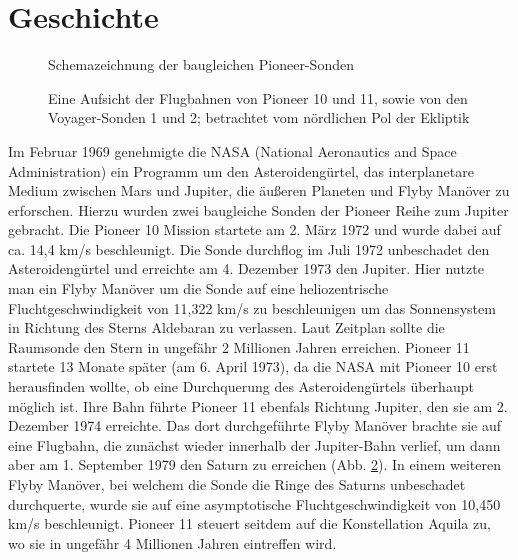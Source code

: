 \section{Geschichte}

\begin{figure}[htbn]
\begin{center}
\noindent    
{}
\end{center}
\vskip -10pt
  \caption{Schemazeichnung der baugleichen Pioneer-Sonden\cite{Turyshev2010}}\label{fig:pioneer}
\end{figure} 

\begin{figure}[htbn]
\begin{center}
\noindent    
{}
\end{center}
\vskip -10pt
  \caption{Eine Aufsicht der Flugbahnen von Pioneer 10 und 11, sowie von den Voyager-Sonden 1 und 2; betrachtet vom nördlichen Pol der Ekliptik\cite{Anderson2002}}
\label{fig:flugbahn}
\end{figure} 


Im Februar 1969 genehmigte die NASA (National Aeronautics and Space
Administration) ein Programm um den Asteroideng\"urtel, das
interplanetare Medium zwischen Mars und Jupiter, die \"au{\ss}eren
Planeten und Flyby Man\"over zu erforschen. Hierzu wurden zwei
baugleiche Sonden der Pioneer Reihe zum Jupiter gebracht. Die Pioneer 10 Mission startete am 2.
M\"arz 1972 und wurde dabei auf ca. 14,4 km/s beschleunigt. Die Sonde
durchflog im Juli 1972 unbeschadet den Asteroideng\"urtel und erreichte
am 4. Dezember 1973 den Jupiter. Hier nutzte man ein Flyby Man\"over
um die Sonde auf eine heliozentrische Fluchtgeschwindigkeit von 11,322
km/s zu beschleunigen um das Sonnensystem in Richtung des Sterns Aldebaran zu verlassen. Laut Zeitplan sollte die
Raumsonde den Stern in ungef\"ahr 2 Millionen Jahren erreichen\cite{Nieto2007}. Pioneer
11 startete 13 Monate sp\"ater (am 6. April 1973), da die NASA mit
Pioneer 10 erst herausfinden wollte, ob eine Durchquerung des
Asteroideng\"urtels \"uberhaupt m\"oglich ist. Ihre Bahn f\"uhrte
Pioneer 11 ebenfals Richtung Jupiter, den sie am 2. Dezember 1974
erreichte. Das dort durchgef\"uhrte Flyby Man\"over brachte sie auf
eine Flugbahn, die zun\"achst wieder innerhalb der Jupiter-Bahn
verlief, um dann aber am 1. September 1979 den Saturn zu erreichen
(Abb. \ref{fig:flugbahn}). In einem weiteren Flyby Man\"over, bei welchem die Sonde die
Ringe des Saturns unbeschadet durchquerte, wurde sie auf eine
asymptotische Fluchtgeschwindigkeit von 10,450 km/s beschleunigt. Pioneer
11 steuert seitdem auf die Konstellation Aquila zu, wo sie in ungef\"ahr 4
Millionen Jahren eintreffen wird.

